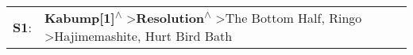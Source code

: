 \begin{supertabular}{p{0.03\textwidth}p{0.92\textwidth}}
 \textbf{S1}:  &  \textbf{Kabump[1]\textsuperscript{$\wedge$}} \textgreater \enspace \textbf{Resolution\textsuperscript{$\wedge$}} \textgreater \enspace The Bottom Half\textsuperscript{}, \enspace Ringo\textsuperscript{} \textgreater \enspace Hajimemashite\textsuperscript{}, \enspace Hurt Bird Bath\textsuperscript{}  \enspace  \\
\end{supertabular}
